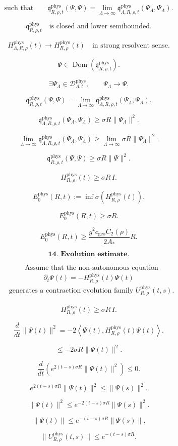 \documentclass[11pt]{article}
\begin{document}
\[
\text{such that}
\qquad
\mathfrak q_{R,\rho,t}^{\mathrm{phys}}(\Psi,\Psi)
=
\lim_{\Lambda\to\infty}
\mathfrak q_{\Lambda,R,\rho,t}^{\mathrm{phys}}(\Psi_\Lambda,\Psi_\Lambda).
\]

\[
\mathfrak q_{R,\rho,t}^{\mathrm{phys}}
\quad
\text{is closed and lower semibounded}.
\]

\[
H_{\Lambda,R,\rho}^{\mathrm{phys}}(t)
\to
H_{R,\rho}^{\mathrm{phys}}(t)
\quad
\text{in strong resolvent sense}.
\]

\[
\Psi\in
\operatorname{Dom}\!\left(
\mathfrak q_{R,\rho,t}^{\mathrm{phys}}
\right).
\]

\[
\exists
\Psi_\Lambda\in\mathscr D_{\Lambda,t}^{\mathrm{phys}},
\qquad
\Psi_\Lambda\to\Psi.
\]

\[
\mathfrak q_{R,\rho,t}^{\mathrm{phys}}(\Psi,\Psi)
=
\lim_{\Lambda\to\infty}
\mathfrak q_{\Lambda,R,\rho,t}^{\mathrm{phys}}(\Psi_\Lambda,\Psi_\Lambda).
\]

\[
\mathfrak q_{\Lambda,R,\rho,t}^{\mathrm{phys}}(\Psi_\Lambda,\Psi_\Lambda)
\ge
\sigma R\|\Psi_\Lambda\|^2.
\]

\[
\lim_{\Lambda\to\infty}
\mathfrak q_{\Lambda,R,\rho,t}^{\mathrm{phys}}(\Psi_\Lambda,\Psi_\Lambda)
\ge
\lim_{\Lambda\to\infty}
\sigma R\|\Psi_\Lambda\|^2.
\]

\[
\mathfrak q_{R,\rho,t}^{\mathrm{phys}}(\Psi,\Psi)
\ge
\sigma R\|\Psi\|^2.
\]

\[
H_{R,\rho}^{\mathrm{phys}}(t)
\ge
\sigma R\,I.
\]

\[
E_0^{\mathrm{phys}}(R,t)
:=
\inf\sigma\!\left(
H_{R,\rho}^{\mathrm{phys}}(t)
\right).
\]

\[
E_0^{\mathrm{phys}}(R,t)
\ge
\sigma R.
\]

\[
\boxed{
E_0^{\mathrm{phys}}(R,t)
\ge
\frac{g^2c_{\mathrm{geo}}C_2(\rho)}{2A_\ast}R.
}
\]

\bigskip

\[
\textbf{14. Evolution estimate.}
\]

\[
\begin{aligned}
&\text{Assume that the non-autonomous equation}
\end{aligned}
\]
\[
\partial_t\Psi(t) = -H_{R,\rho}^{\mathrm{phys}}(t)\Psi(t)
\]
\[
\begin{aligned}
&\text{generates a contraction evolution family }
U_{R,\rho}^{\mathrm{phys}}(t,s).
\end{aligned}
\]

\[
H_{R,\rho}^{\mathrm{phys}}(t)
\ge
\sigma R\,I.
\]

\[
\frac{d}{dt}\|\Psi(t)\|^2
=
-2\left\langle
\Psi(t),
H_{R,\rho}^{\mathrm{phys}}(t)\Psi(t)
\right\rangle.
\]

\[
\le
-2\sigma R\|\Psi(t)\|^2.
\]

\[
\frac{d}{dt}
\left(
e^{2(t-s)\sigma R}\|\Psi(t)\|^2
\right)
\le0.
\]

\[
e^{2(t-s)\sigma R}\|\Psi(t)\|^2
\le
\|\Psi(s)\|^2.
\]

\[
\|\Psi(t)\|^2
\le
e^{-2(t-s)\sigma R}\|\Psi(s)\|^2.
\]

\[
\|\Psi(t)\|
\le
e^{-(t-s)\sigma R}\|\Psi(s)\|.
\]

\[
\boxed{
\|U_{R,\rho}^{\mathrm{phys}}(t,s)\|
\le
e^{-(t-s)\sigma R}.
}
\]
\end{document}
